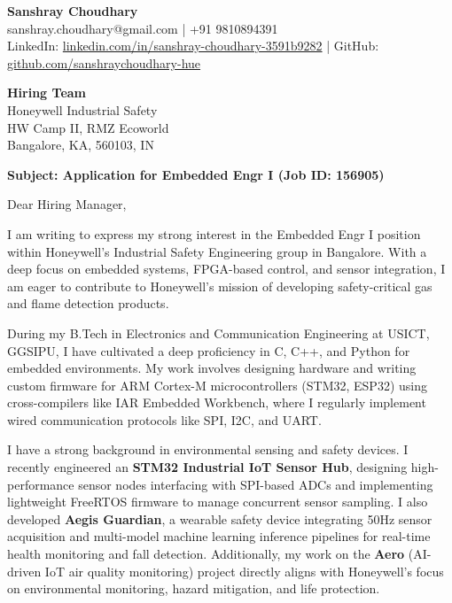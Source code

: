 \documentclass[10pt,a4paper]{article}
\begin{document}
\thispagestyle{empty}

\begin{flushleft}
\textbf{\LARGE Sanshray Choudhary} \\
\vspace{4pt}
sanshray.choudhary@gmail.com | +91 9810894391 \\
LinkedIn: \href{https://www.linkedin.com/in/sanshray-choudhary-3591b9282}{linkedin.com/in/sanshray-choudhary-3591b9282} | GitHub: \href{https://github.com/sanshraychoudhary-hue}{github.com/sanshraychoudhary-hue}
\end{flushleft}

\vspace{1em}

\begin{flushleft}
\textbf{Hiring Team} \\
Honeywell Industrial Safety \\
HW Camp II, RMZ Ecoworld \\
Bangalore, KA, 560103, IN
\end{flushleft}

\vspace{1em}

\textbf{Subject: Application for Embedded Engr I (Job ID: 156905)}

\vspace{1em}

Dear Hiring Manager,

I am writing to express my strong interest in the Embedded Engr I position within Honeywell’s Industrial Safety Engineering group in Bangalore. With a deep focus on embedded systems, FPGA-based control, and sensor integration, I am eager to contribute to Honeywell’s mission of developing safety-critical gas and flame detection products.

During my B.Tech in Electronics and Communication Engineering at USICT, GGSIPU, I have cultivated a deep proficiency in C, C++, and Python for embedded environments. My work involves designing hardware and writing custom firmware for ARM Cortex-M microcontrollers (STM32, ESP32) using cross-compilers like IAR Embedded Workbench, where I regularly implement wired communication protocols like SPI, I2C, and UART. 

I have a strong background in environmental sensing and safety devices. I recently engineered an \textbf{STM32 Industrial IoT Sensor Hub}, designing high-performance sensor nodes interfacing with SPI-based ADCs and implementing lightweight FreeRTOS firmware to manage concurrent sensor sampling. I also developed \textbf{Aegis Guardian}, a wearable safety device integrating 50Hz sensor acquisition and multi-model machine learning inference pipelines for real-time health monitoring and fall detection. Additionally, my work on the \textbf{Aero} (AI-driven IoT air quality monitoring) project directly aligns with Honeywell's focus on environmental monitoring, hazard mitigation, and life protection.
\end{document}
